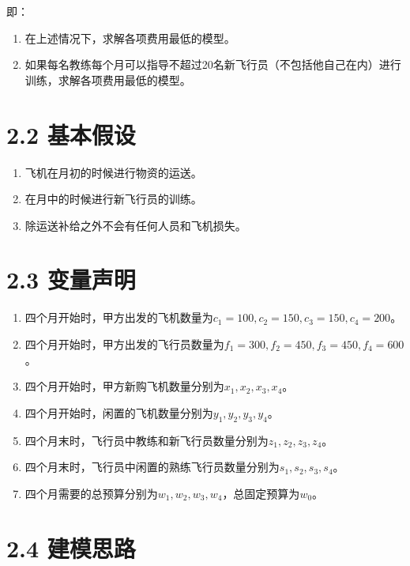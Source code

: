 \documentclass[bachelor,openany,oneside,color]{buaathesis}
\begin{document}
即：

\begin{enumerate}
\def\labelenumi{\arabic{enumi}.}
\item
  在上述情况下，求解各项费用最低的模型。
\item
  如果每名教练每个月可以指导不超过20名新飞行员（不包括他自己在内）进行训练，求解各项费用最低的模型。
\end{enumerate}

\hypertarget{header-n168}{%
\section{2.2 基本假设}\label{header-n168}}

\begin{enumerate}
\def\labelenumi{\arabic{enumi}.}
\item
  飞机在月初的时候进行物资的运送。
\item
  在月中的时候进行新飞行员的训练。
\item
  除运送补给之外不会有任何人员和飞机损失。
\end{enumerate}

\hypertarget{header-n176}{%
\section{2.3 变量声明}\label{header-n176}}

\begin{enumerate}
\def\labelenumi{\arabic{enumi}.}
\item
  四个月开始时，甲方出发的飞机数量为\(c_1=100,c_2=150,c_3=150,c_4=200\)。
\item
  四个月开始时，甲方出发的飞行员数量为\(f_1=300,f_2=450,f_3=450,f_4=600\)。
\item
  四个月开始时，甲方新购飞机数量分别为\(x_1,x_2,x_3,x_4\)。
\item
  四个月开始时，闲置的飞机数量分别为\(y_1,y_2,y_3,y_4\)。
\item
  四个月末时，飞行员中教练和新飞行员数量分别为\(z_1,z_2,z_3,z_4\)。
\item
  四个月末时，飞行员中闲置的熟练飞行员数量分别为\(s_1,s_2,s_3,s_4\)。
\item
  四个月需要的总预算分别为\(w_1,w_2,w_3,w_4\)，总固定预算为\(w_0\)。
\end{enumerate}

\hypertarget{header-n192}{%
\section{2.4 建模思路}\label{header-n192}}
\end{document}
